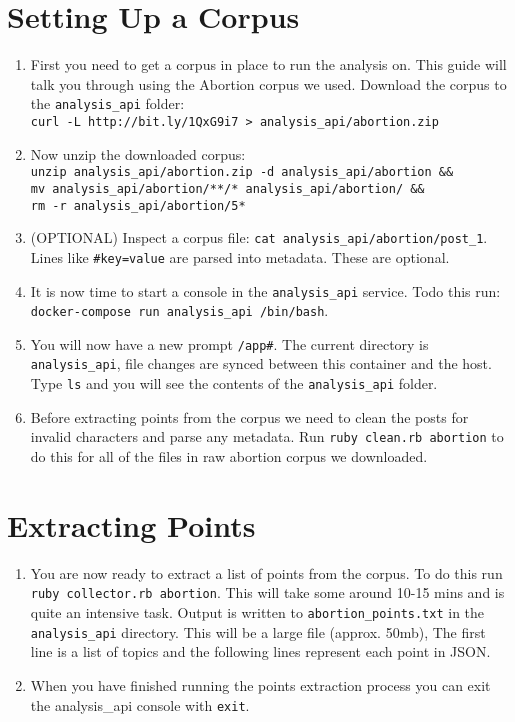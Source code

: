 \section{Setting Up a Corpus}
\begin{enumerate}
	\item{First you need to get a corpus in place to run the analysis on. This guide will talk you through using the Abortion corpus we used. Download the corpus to the \texttt{analysis\_api} folder: \\  \texttt{curl -L http://bit.ly/1QxG9i7 > analysis\_api/abortion.zip}}
	\item{Now unzip the downloaded corpus: \\ \texttt{unzip analysis\_api/abortion.zip -d analysis\_api/abortion \&\& \\ mv analysis\_api/abortion/**/* analysis\_api/abortion/ \&\& \\ rm -r analysis\_api/abortion/5*}}
	\item{(OPTIONAL) Inspect a corpus file: \texttt{cat analysis\_api/abortion/post\_1}. Lines like \texttt{\#key=value} are parsed into metadata. These are optional.}
	\item{It is now time to start a console in the \texttt{analysis\_api} service. Todo this run: \texttt{docker-compose run analysis\_api /bin/bash}.}
	\item{You will now have a new prompt \texttt{/app\#}. The current directory is \texttt{analysis\_api}, file changes are synced between this container and the host. Type \texttt{ls} and you will see the contents of the \texttt{analysis\_api} folder.}
	\item{Before extracting points from the corpus we need to clean the posts for invalid characters and parse any metadata. Run \texttt{ruby clean.rb abortion} to do this for all of the files in raw abortion corpus we downloaded.}
\end{enumerate}

\section{Extracting Points}
\begin{enumerate}
	\item{You are now ready to extract a list of points from the corpus. To do this run \texttt{ruby collector.rb abortion}. This will take some around 10-15 mins and is quite an intensive task. Output is written to \texttt{abortion\_points.txt} in the \texttt{analysis\_api} directory. This will be a large file (approx. 50mb), The first line is a list of topics and the following lines represent each point in JSON.}
	\item{When you have finished running the points extraction process you  can exit the analysis\_api console with \texttt{exit}.}
\end{enumerate}

